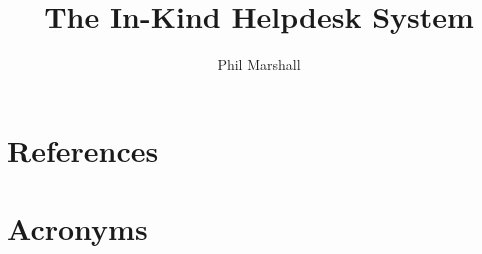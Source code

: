 \documentclass[DM,authoryear,toc]{lsstdoc}
\title{The In-Kind Helpdesk System}
\author{%
Phil Marshall
}
\date{\vcsDate}
\begin{document}
\maketitle


\appendix
\section{References} \label{sec:bib}
\renewcommand{\refname}{} %


\section{Acronyms} \label{sec:acronyms}

\end{document}
